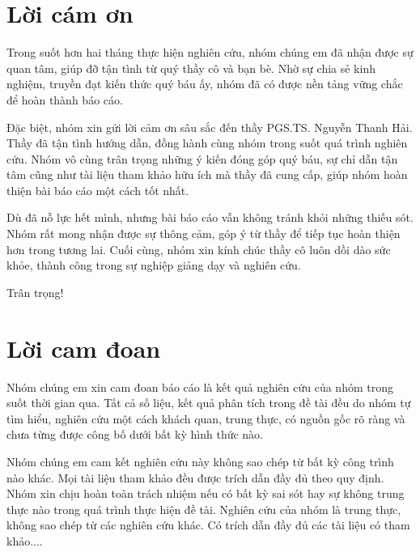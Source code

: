 \chapter*{Lời cám ơn}
\startcontents[chapters]
Trong suốt hơn hai tháng thực hiện nghiên cứu, nhóm chúng em đã nhận được sự quan tâm, giúp đỡ tận tình từ quý thầy cô và bạn bè. Nhờ sự chia sẻ kinh nghiệm, truyền đạt kiến thức quý báu ấy, nhóm đã có được nền tảng vững chắc để hoàn thành báo cáo.

Đặc biệt, nhóm xin gửi lời cảm ơn sâu sắc đến thầy PGS.TS. Nguyễn Thanh Hải. Thầy đã tận tình hướng dẫn, đồng hành cùng nhóm trong suốt quá trình nghiên cứu. Nhóm vô cùng trân trọng những ý kiến đóng góp quý báu, sự chỉ dẫn tận tâm cũng như tài liệu tham khảo hữu ích mà thầy đã cung cấp, giúp nhóm hoàn thiện bài báo cáo một cách tốt nhất.

Dù đã nỗ lực hết mình, nhưng bài báo cáo vẫn không tránh khỏi những thiếu sót. Nhóm rất mong nhận được sự thông cảm, góp ý từ thầy để tiếp tục hoàn thiện hơn trong tương lai.
Cuối cùng, nhóm xin kính chúc thầy cô luôn dồi dào sức khỏe, thành công trong sự nghiệp giảng dạy và nghiên cứu.

Trân trọng!
\chapter*{Lời cam đoan}
Nhóm chúng em xin cam đoan báo cáo là kết quả nghiên cứu của nhóm trong suốt thời gian qua. Tất cả số liệu, kết quả phân tích trong đề tài đều do nhóm tự tìm hiểu, nghiên cứu một cách khách quan, trung thực, có nguồn gốc rõ ràng và chưa từng được công bố dưới bất kỳ hình thức nào.

Nhóm chúng em cam kết nghiên cứu này không sao chép từ bất kỳ công trình nào khác. Mọi tài liệu tham khảo đều được trích dẫn đầy đủ theo quy định. Nhóm xin chịu hoàn toàn trách nhiệm nếu có bất kỳ sai sót hay sự không trung thực nào trong quá trình thực hiện đề tài.
Nghiên cứu của nhóm là trung thực, không sao chép từ các nghiên cứu khác. Có trích dẫn đầy đủ các tài liệu có tham khảo....

